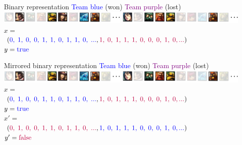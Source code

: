 \begin{frame}{Binary representation}
\centering
\textcolor{blue}{Team blue} (won) \hspace{40pt} \textcolor{purple}{Team purple} (lost)\\
\includegraphics[width=0.47\textwidth]{img/kent/pickblue.png}\hspace{2pt}%
\includegraphics[width=0.47\textwidth]{img/kent/pickpurple.png}\\
\vspace{18pt}
$x =$\\
\hspace{2pt} $(\textcolor{blue}{0,\;1,\;0,\;0,\;1,\;1,\;0,\;1,\;1,\;0,\;...},\textcolor{purple}{1,\;0,\;1,\;1,\;1,\;0,\;0,\;0,\;1,\;0,...})$\\
\vspace{18pt}
$y = \textcolor{blue}{\text{true}}$
\end{frame}

\begin{frame}{Mirrored binary representation}
\centering
\textcolor{blue}{Team blue} (won) \hspace{40pt} \textcolor{purple}{Team purple} (lost)\\
\includegraphics[width=0.47\textwidth]{img/kent/pickblue.png}\hspace{2pt}%
\includegraphics[width=0.47\textwidth]{img/kent/pickpurple.png}\\
\vspace{18pt}
$x =$\\
\hspace{2pt} $(\textcolor{blue}{0,\;1,\;0,\;0,\;1,\;1,\;0,\;1,\;1,\;0,\;...},\textcolor{purple}{1,\;0,\;1,\;1,\;1,\;0,\;0,\;0,\;1,\;0,...})$\\
$y = \textcolor{blue}{\text{true}}$\\
\vspace{18pt}
$x' =$\\
\hspace{2pt} $(\textcolor{purple}{0,\;1,\;0,\;0,\;1,\;1,\;0,\;1,\;1,\;0,\;...},\textcolor{blue}{1,\;0,\;1,\;1,\;1,\;0,\;0,\;0,\;1,\;0,...})$\\
$y' = \textcolor{purple}{\text{false}}$
\end{frame}

